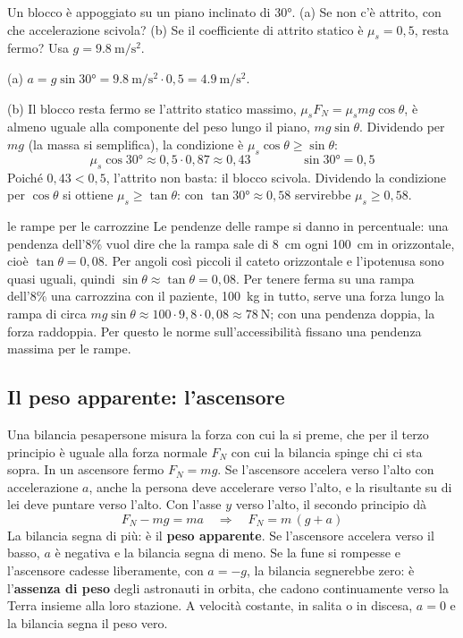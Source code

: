 \begin{esempio}
Un blocco è appoggiato su un piano inclinato di \ang{30}. (a) Se non c'è attrito, con che accelerazione scivola? (b) Se il coefficiente di attrito statico è $\mu_s = 0{,}5$, resta fermo? Usa $g = \SI{9,8}{\metre\per\second\squared}$.

(a) $a = g\sin\ang{30} = \SI{9,8}{\metre\per\second\squared} \cdot 0{,}5 = \SI{4,9}{\metre\per\second\squared}$.

(b) Il blocco resta fermo se l'attrito statico massimo, $\mu_s F_N = \mu_s mg\cos\theta$, è almeno uguale alla componente del peso lungo il piano, $mg\sin\theta$. Dividendo per $mg$ (la massa si semplifica), la condizione è $\mu_s\cos\theta \geq \sin\theta$:
\[
  \mu_s\cos\ang{30} \approx 0{,}5 \cdot 0{,}87 \approx 0{,}43 \qquad\qquad \sin\ang{30} = 0{,}5
\]
Poiché $0{,}43 < 0{,}5$, l'attrito non basta: il blocco scivola. Dividendo la condizione per $\cos\theta$ si ottiene $\mu_s \geq \tan\theta$: con $\tan\ang{30} \approx 0{,}58$ servirebbe $\mu_s \geq 0{,}58$.
\end{esempio}

\begin{applicazione}{le rampe per le carrozzine}
Le pendenze delle rampe si danno in percentuale: una pendenza dell'8\% vuol dire che la rampa sale di \SI{8}{\centi\metre} ogni \SI{100}{\centi\metre} in orizzontale, cioè $\tan\theta = 0{,}08$. Per angoli così piccoli il cateto orizzontale e l'ipotenusa sono quasi uguali, quindi $\sin\theta \approx \tan\theta = 0{,}08$. Per tenere ferma su una rampa dell'8\% una carrozzina con il paziente, \SI{100}{\kilo\gram} in tutto, serve una forza lungo la rampa di circa $mg\sin\theta \approx 100 \cdot 9{,}8 \cdot 0{,}08 \approx \SI{78}{\newton}$; con una pendenza doppia, la forza raddoppia. Per questo le norme sull'accessibilità fissano una pendenza massima per le rampe.
\end{applicazione}

\subsection{Il peso apparente: l'ascensore}

Una bilancia pesapersone misura la forza con cui la si preme, che per il terzo principio è uguale alla forza normale $F_N$ con cui la bilancia spinge chi ci sta sopra. In un ascensore fermo $F_N = mg$. Se l'ascensore accelera verso l'alto con accelerazione $a$, anche la persona deve accelerare verso l'alto, e la risultante su di lei deve puntare verso l'alto. Con l'asse $y$ verso l'alto, il secondo principio dà
\[
  F_N - mg = m a \quad\Longrightarrow\quad F_N = m\,(g + a)
\]
La bilancia segna di più: è il \textbf{peso apparente}. Se l'ascensore accelera verso il basso, $a$ è negativa e la bilancia segna di meno. Se la fune si rompesse e l'ascensore cadesse liberamente, con $a = -g$, la bilancia segnerebbe zero: è l'\textbf{assenza di peso} degli astronauti in orbita, che cadono continuamente verso la Terra insieme alla loro stazione. A velocità costante, in salita o in discesa, $a = 0$ e la bilancia segna il peso vero.

